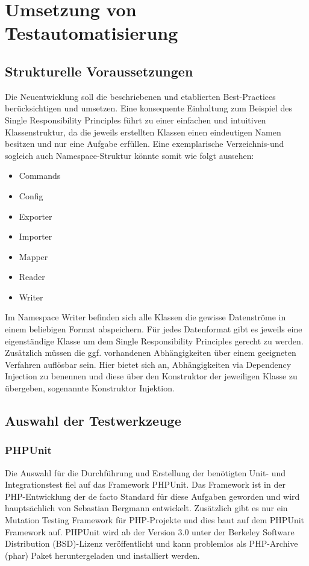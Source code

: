 \newpage
\section{Umsetzung von Testautomatisierung}\label{umsetzung}

\subsection{Strukturelle Voraussetzungen}
Die Neuentwicklung soll die beschriebenen und etablierten Best-Practices berücksichtigen und umsetzen. Eine konsequente Einhaltung zum Beispiel des Single Responsibility Principles führt zu einer einfachen und intuitiven Klassenstruktur,  da die jeweils erstellten Klassen einen eindeutigen Namen besitzen und nur eine Aufgabe erfüllen. Eine exemplarische Verzeichnis-und sogleich auch Namespace-Struktur könnte somit wie folgt aussehen: 

\begin{itemize}
	\item Commands
	\item Config
	\item Exporter
	\item Importer
	\item Mapper
	\item Reader
	\item Writer
\end{itemize}

Im Namespace Writer befinden sich alle Klassen die gewisse Datenströme in einem beliebigen Format abspeichern. Für jedes Datenformat gibt es jeweils eine eigenständige Klasse um dem Single Responsibility Principles gerecht zu werden. Zusätzlich müssen die ggf. vorhandenen Abhängigkeiten über einem geeigneten Verfahren auflösbar sein. Hier bietet sich an, Abhängigkeiten via Dependency Injection zu benennen und diese über den Konstruktor der jeweiligen Klasse zu übergeben, sogenannte Konstruktor Injektion.%

\subsection{Auswahl der Testwerkzeuge}
\subsubsection{PHPUnit}
Die Auswahl für die Durchführung und Erstellung der benötigten Unit- und Integrationstest fiel auf das Framework PHPUnit. Das Framework ist in der PHP-Entwicklung der de facto Standard für diese Aufgaben geworden und wird hauptsächlich von Sebastian Bergmann entwickelt. Zusätzlich gibt es nur ein Mutation Testing Framework für PHP-Projekte und dies baut auf dem PHPUnit Framework auf. PHPUnit wird ab der Version 3.0 unter der Berkeley Software Distribution (BSD)-Lizenz veröffentlicht und kann problemlos als PHP-Archive (phar) Paket heruntergeladen und installiert werden.

